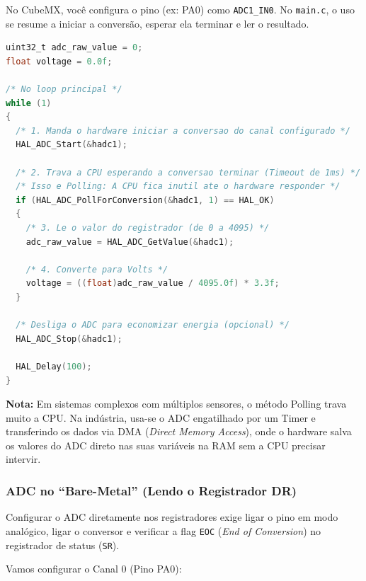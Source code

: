 \documentclass[12pt,a4paper]{article}
\begin{document}
No CubeMX, você configura o pino (ex: PA0) como \texttt{ADC1\_IN0}. No \texttt{main.c}, o uso se resume a iniciar a conversão, esperar ela terminar e ler o resultado.

\begin{lstlisting}[language=C]
uint32_t adc_raw_value = 0;
float voltage = 0.0f;

/* No loop principal */
while (1)
{
  /* 1. Manda o hardware iniciar a conversao do canal configurado */
  HAL_ADC_Start(&hadc1);
  
  /* 2. Trava a CPU esperando a conversao terminar (Timeout de 1ms) */
  /* Isso e Polling: A CPU fica inutil ate o hardware responder */
  if (HAL_ADC_PollForConversion(&hadc1, 1) == HAL_OK)
  {
    /* 3. Le o valor do registrador (de 0 a 4095) */
    adc_raw_value = HAL_ADC_GetValue(&hadc1);
    
    /* 4. Converte para Volts */
    voltage = ((float)adc_raw_value / 4095.0f) * 3.3f;
  }
  
  /* Desliga o ADC para economizar energia (opcional) */
  HAL_ADC_Stop(&hadc1);
  
  HAL_Delay(100);
}
\end{lstlisting}

\textbf{Nota:} Em sistemas complexos com múltiplos sensores, o método Polling trava muito a CPU. Na indústria, usa-se o ADC engatilhado por um Timer e transferindo os dados via DMA (\textit{Direct Memory Access}), onde o hardware salva os valores do ADC direto nas suas variáveis na RAM sem a CPU precisar intervir.

\subsubsection{ADC no ``Bare-Metal'' (Lendo o Registrador DR)}
Configurar o ADC diretamente nos registradores exige ligar o pino em modo analógico, ligar o conversor e verificar a flag \texttt{EOC} (\textit{End of Conversion}) no registrador de status (\texttt{SR}). 

Vamos configurar o Canal 0 (Pino PA0):
\end{document}
